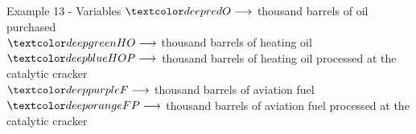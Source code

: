 \begin{frame}{Example 13 - Variables}
\large{
$\colora{O}   \longrightarrow$
    thousand barrels of oil purchased \\ \vspace{5mm}
$\colorb{HO}  \longrightarrow$
    thousand barrels of heating oil \\ \vspace{5mm}
$\colorc{HOP} \longrightarrow$
    thousand barrels of heating oil processed at the catalytic cracker \\ \vspace{5mm}
$\colord{F}   \longrightarrow$
    thousand barrels of aviation fuel \\ \vspace{5mm}
$\colore{FP}  \longrightarrow$
    thousand barrels of aviation fuel processed at the catalytic cracker
}
\end{frame}
